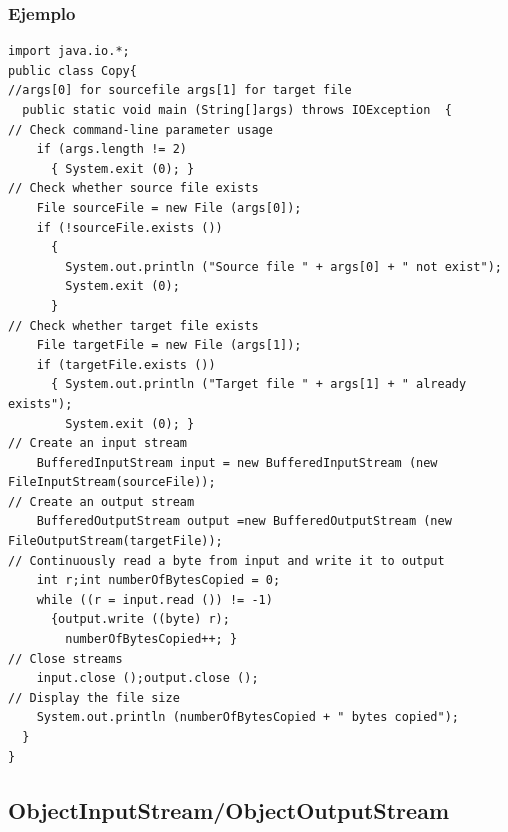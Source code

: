 \documentclass{beamer}
\begin{document}
\begin{frame}[fragile]
\frametitle{Ejemplo}
\begin{tiny}
\begin{verbatim}
import java.io.*;
public class Copy{
//args[0] for sourcefile args[1] for target file
  public static void main (String[]args) throws IOException  {
// Check command-line parameter usage
    if (args.length != 2)
      { System.exit (0); }
// Check whether source file exists
    File sourceFile = new File (args[0]);
    if (!sourceFile.exists ())
      {
        System.out.println ("Source file " + args[0] + " not exist");
        System.exit (0);
      }
// Check whether target file exists
    File targetFile = new File (args[1]);
    if (targetFile.exists ())
      { System.out.println ("Target file " + args[1] + " already exists");
        System.exit (0); }
// Create an input stream
    BufferedInputStream input = new BufferedInputStream (new FileInputStream(sourceFile));
// Create an output stream
    BufferedOutputStream output =new BufferedOutputStream (new FileOutputStream(targetFile));
// Continuously read a byte from input and write it to output
    int r;int numberOfBytesCopied = 0;
    while ((r = input.read ()) != -1)
      {output.write ((byte) r);
        numberOfBytesCopied++; }
// Close streams
    input.close ();output.close ();
// Display the file size
    System.out.println (numberOfBytesCopied + " bytes copied");
  }
}
\end{verbatim}
\end{tiny}
\end{frame}

\subsection{ObjectInputStream/ObjectOutputStream}
\end{document}
